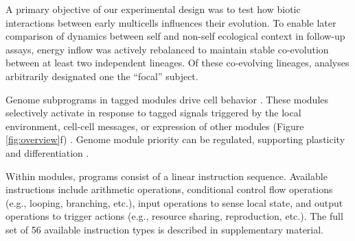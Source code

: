 A primary objective of our experimental design was to test how biotic interactions between early multicells influences their evolution.
To enable later comparison of dynamics between self and non-self ecological context in follow-up assays, energy inflow was actively rebalanced to maintain stable co-evolution between at least two independent lineages.
Of these co-evolving lineages, analyses arbitrarily designated one the ``focal'' subject.

Genome subprograms in tagged modules drive cell behavior \citep{lalejini2018evolving}.
These modules selectively activate in response to tagged signals triggered by the local environment, cell-cell messages, or expression of other modules (Figure \ref{fig:overview}f) \citep{moreno2023matchmaker,holland2012signals}.
Genome module priority can be regulated, supporting plasticity and differentiation \citep{lalejini2021tag}.

Within modules, programs consist of a linear instruction sequence.
Available instructions include arithmetic operations, conditional control flow operations (e.g., looping, branching, etc.), input operations to sense local state, and output operations to trigger actions (e.g., resource sharing, reproduction, etc.).
The full set of 56 available instruction types is described in supplementary material.
